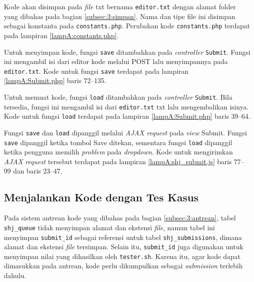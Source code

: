 Kode akan disimpan pada \textit{file} txt bernama \verb|editor.txt| dengan alamat folder yang dibahas pada bagian \ref{subsec:3:simpan}. Nama dan tipe file ini disimpan sebagai konstanta pada \verb|constants.php|. Perubahan kode \verb|constants.php| terdapat pada lampiran \ref{lampA:constants.php}.

Untuk menyimpan kode, fungsi \verb|save| ditambahkan pada \textit{controller} \verb|Submit|. Fungsi ini mengambil isi dari editor kode melalui POST lalu menyimpannya pada \verb|editor.txt|. Kode untuk fungsi \verb|save| terdapat pada lampiran \ref{lampA:Submit.php} baris 72--135.

Untuk memuat kode, fungsi \verb|load| ditambahkan pada \textit{controller} \verb|Submit|. Bila tersedia, fungsi ini mengambil isi dari \verb|editor.txt| txt lalu mengembalikan isinya. Kode untuk fungsi \verb|load| terdapat pada lampiran \ref{lampA:Submit.php} baris 39--64.

Fungsi \verb|save| dan \verb|load| dipanggil melalui \textit{AJAX request} pada \textit{view} Submit. Fungsi \verb|save| dipanggil ketika tombol Save ditekan, sementara fungsi \verb|load| dipanggil ketika pengguna memilih \textit{problem} pada \textit{dropdown}. Kode untuk mengirimkan \textit{AJAX request} tersebut terdapat pada lampiran \ref{lampA:shj_submit.js} baris 77--99 dan baris 23--47.

\subsection{Menjalankan Kode dengan Tes Kasus}
\label{sec:5:jalan}

Pada sistem antrean kode yang dibahas pada bagian \ref{subsec:3:antrean}, tabel \verb|shj_queue| tidak menyimpan alamat dan ekstensi \textit{file}, namun tabel ini menyimpan \verb|submit_id| sebagai referensi untuk tabel \verb|shj_submissions|, dimana alamat dan ekstensi \textit{file} tersimpan. Selain itu, \verb|submit_id| juga digunakan untuk menyimpan nilai yang dihasilkan oleh \verb|tester.sh|. Karena itu, agar kode dapat dimasukkan pada antrean, kode perlu dikumpulkan sebagai \textit{submission} terlebih dahulu. 


